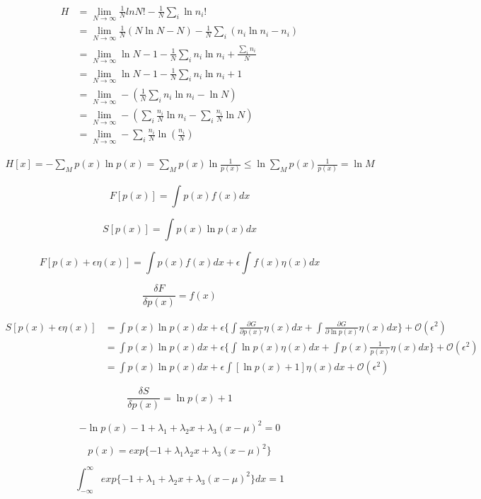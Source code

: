 $$
\begin{aligned}
  H &= \lim\limits_{N\to \infty}\frac{1}{N}lnN!-\frac{1}{N}\sum_i \ln n_i!\\
  & = \lim\limits_{N\to \infty}\frac{1}{N}(N\ln N - N)-\frac{1}{N}\sum_i (n_i\ln n_i - n_i)\\
  & = \lim\limits_{N\to \infty} \ln N - 1 - \frac{1}{N}\sum_i n_i \ln n_i + \frac{\sum_i n_i}{N}\\
  & = \lim\limits_{N\to \infty} \ln N - 1 - \frac{1}{N}\sum_i n_i \ln n_i + 1\\
  & = \lim\limits_{N\to \infty} -(\frac{1}{N}\sum_i n_i \ln n_i -\ln N)\\
  & = \lim\limits_{N\to \infty} -(\sum_i \frac{n_i}{N}\ln n_i - \sum_i \frac{n_i}{N}\ln N)\\
  & = \lim\limits_{N\to \infty} -\sum_i \frac{n_i}{N}\ln(\frac{n_i}{N})
\end{aligned}
$$

$$
\begin{aligned}
  H[x] = -\sum_M p(x)\ln p(x) = \sum_M p(x)\ln \frac{1}{p(x)} \leqslant \ln \sum_M p(x)\frac{1}{p(x)} = \ln M
\end{aligned}
$$

$$
F[p(x)] = \int p(x)f(x)dx
$$

$$
S[p(x)] = \int p(x)\ln p(x)dx
$$

$$
F[p(x)+ \epsilon \eta(x)] = \int p(x)f(x)dx + \epsilon \int f(x) \eta(x)dx
$$

$$
\frac{\delta F}{\delta p(x)} = f(x)
$$

$$
\begin{aligned}
S[p(x) + \epsilon \eta (x)] &= \int p(x)\ln p(x)dx + \epsilon \{\int \frac{\partial G}{\partial p(x)} \eta(x)dx + \int \frac{\partial G}{\partial \ln p(x)} \eta(x)dx\} + \mathcal{O}(\epsilon^2)\\
& = \int p(x)\ln p(x)dx + \epsilon \{\int \ln p(x) \eta(x)dx + \int p(x)\frac{1}{p(x)} \eta(x)dx\} + \mathcal{O}(\epsilon^2)\\
& = \int p(x)\ln p(x)dx + \epsilon \int [\ln p(x) + 1]\eta(x)dx + \mathcal{O}(\epsilon^2)
\end{aligned}
$$

$$
\frac{\delta S}{\delta p(x)} = \ln p(x) + 1
$$

$$
-\ln p(x) - 1 + \lambda_1 + \lambda_2 x + \lambda_3(x - \mu)^2 = 0
$$

$$
p(x) = exp\{-1 + \lambda_1 \lambda_2 x + \lambda_3(x - \mu)^2\}
$$

$$
\int_{-\infty}^\infty exp\{-1+\lambda_1 + \lambda_2x + \lambda_3(x-\mu)^2\}dx = 1
$$

